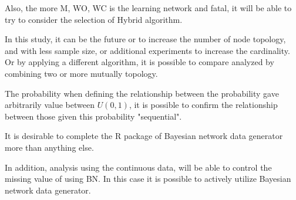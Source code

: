 Also, the more M, WO, WC is the learning network and fatal, it will be able to try to consider the selection of Hybrid algorithm.

In this study, it can be the future or to increase the number of node topology, and with less sample size, or additional experiments to increase the cardinality. Or by applying a different algorithm, it is possible to compare analyzed by combining two or more mutually topology.

The probability when defining the relationship between the probability gave arbitrarily value between $U(0,1)$, it is possible to confirm the relationship between those given this probability "sequential".

It is desirable to complete the R package of Bayesian network data generator more than anything else.

In addition, analysis using the continuous data, will be able to control the missing value of using BN. In this case it is possible to actively utilize Bayesian network data generator.